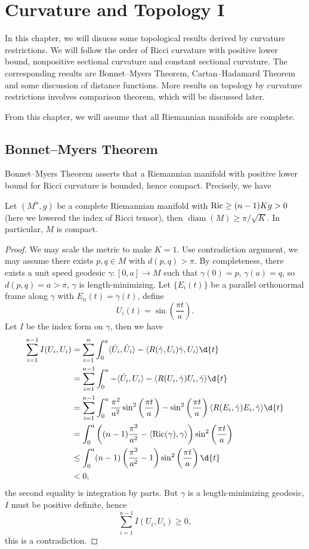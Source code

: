 \chapter{Curvature and Topology I}
In this chapter, we will disucss some topological results derived by curvature restrictions.
We will follow the order of Ricci curvature with positive lower bound, nonpositive sectional curvature and constant sectional curvature.
The corresponding results are Bonnet--Myers Theorem, Cartan--Hadamard Theorem and some discussion of distance functions.
More results on topology by curvature restrictions involves comparison theorem, which will be discussed later.

From this chapter, we will assume that all Riemannian manifolds are complete.

\section{Bonnet--Myers Theorem}

Bonnet--Myers Theorem asserts that a Riemannian manifold with positive lower bound for Ricci curvature is bounded, hence compact.
Precisely, we have
\begin{thm}
    Let $(M^n,g)$ be a complete Riemannian manifold with $\operatorname{Ric}\geq(n-1)Kg>0$ (here we lowered the index of Ricci tensor), then $\operatorname{diam}(M)\geq\pi/\sqrt{K}$.
    In particular, $M$ is compact.
\end{thm}
\begin{proof}
    We may scale the metric to make $K=1$.
    Use contradiction argument, we may assume there exists $p,q\in M$ with $d(p,q)>\pi$.
    By completeness, there exists a unit speed geodesic $\gamma:[0,a]\to M$ such that $\gamma(0)=p$, $\gamma(a)=q$, so $d(p,q)=a>\pi$, $\gamma$ is length-minimizing.
    Let $\{E_i(t)\}$ be a parallel orthonormal frame along $\gamma$ with $E_n(t)=\dot\gamma(t)$, define
    \[U_i(t)=\sin\left(\frac{\pi t}{a}\right).\]
    Let $I$ be the index form on $\gamma$, then we have
    \begin{align*}
        \sum_{i=1}^{n-1}I(U_i,U_i)&=\sum_{i=1}^n\int_0^a\langle\dot U_i,\dot U_i\rangle-\langle R(\dot\gamma,U_i)\dot\gamma,U_i\rangle\d{t}\\
        &=\sum_{i=1}^{n-1}\int_0^a-\langle\ddot{U}_i,U_i\rangle-\langle R(U_i,\dot\gamma)U_i,\dot\gamma\rangle\d{t}\\
        &=\sum_{i=1}^{n-1}\int_0^a\frac{\pi^2}{a^2}\sin^2\left(\frac{\pi t}{a}\right)-\sin^2\left(\frac{\pi t}{a}\right)\langle R(E_i,\dot\gamma)E_i,\dot\gamma\rangle\d{t}\\
        &=\int_0^a\left((n-1)\frac{\pi^2}{a^2}-\langle\Ric(\gamma),\gamma\rangle\right)\sin^2\left(\frac{\pi t}{a}\right)\\
        &\leq\int_0^a(n-1)\left(\frac{\pi^2}{a^2}-1\right)\sin^2\left(\frac{\pi t}{a}\right)\d{t}\\
        &<0,
    \end{align*}
    the second equality is integration by parts.
    But $\gamma$ is a length-minimizing geo\-desic, $I$ must be positive definite, hence
    \[\sum_{i=1}^{n-1}I(U_i,U_i)\geq 0,\]
    this is a contradiction.
\end{proof}

